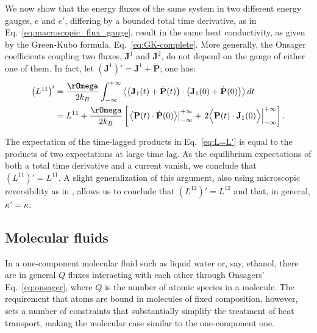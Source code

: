 We now show that the energy fluxes of the same system in two different energy gauges, $e$ and $e'$, differing by a bounded total time derivative, as in Eq.~\eqref{eq:macroscopic_flux_gauge}, result in the same heat conductivity, as given by the Green-Kubo formula, Eq.~\eqref{eq:GK-complete}. More generally, the Onsager coefficients coupling two fluxes, $\mathbf{J}^1$ and $\mathbf{J}^2$, do not depend on the gauge of either one of them. In fact, let $\left(\mathbf{J}^1\right)' = \mathbf{J}^1 + \dot{\mathbf{P}}$; one has:
\begin{equation}
  \begin{aligned}
    \left (L^{11} \right)' &= \frac{\rOmega}{2 k_B }\int_{-\infty}^{+\infty} \left \langle \left (\mathbf{J}_1(t)+\dot{\mathbf{P}}(t) \right ) \cdot  \left (\mathbf{J}_1(0)+\dot{\mathbf{P}}(0)\right ) \right \rangle dt \\
    &= L^{11} + \frac{\rOmega}{2 k_B } \left[ \left .  \left \langle \mathbf{P}(t) \cdot \dot{\mathbf{P}}(0) \right \rangle \right |^{+\infty}_{-\infty} + \left .  2 \Bigl \langle \mathbf{P}(t) \cdot \mathbf{J}_1(0) \Bigr \rangle \right |^{+\infty}_{-\infty} \right] .
  \end{aligned} \label{eq:L=L'}
\end{equation}

The expectation of the time-lagged products in Eq.~\eqref{eq:L=L'} is equal to the products of two expectations at large time lag. As the equilibrium expectations of both a total time derivative and a current vanish, we conclude that $\left (L^{11}\right )'=L^{11}$. A slight generalization of this argument, also using microscopic reversibility as in \cite{Onsager1931a,Onsager1931b}, allows us to conclude that $\left (L^{12} \right )'=L^{12}$ and that, in general, $\kappa'=\kappa$.


\subsection{Molecular fluids} \label{sec:MolecularFluids}
In a one-component molecular fluid such as liquid water or, say, ethanol, there are in general $Q$ fluxes interacting with each other through Onsagers' Eq.~\eqref{eq:onsager}, where $Q$ is the number of atomic species in a molecule. The requirement that atoms are bound in molecules of fixed composition, however, sets a number of constraints that substantially simplify the treatment of heat transport, making the molecular case similar to the one-component one.

